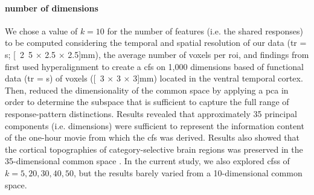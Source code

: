 

\paragraph{number of dimensions}


We chose a value of $k=10$ for the number of features (i.e. the shared
responses) to be computed considering the temporal and spatial resolution of our
data (\ac{tr} = \unit[2]{s}; \unit[2.5 $\times$ 2.5 $\times$ 2.5]{mm}), the
average number of voxels per \ac{roi}, and findings from \citet{haxby2011common}
%
\citet{haxby2011common} first used hyperalignment to create a \ac{cfs} on 1,000 dimensions based of functional data (\ac{tr} = \unit[3]{s}) of
voxels (\unit[3 $\times$ 3 $\times$ 3]{mm}) located in the ventral temporal
cortex.
%
Then, \citet{haxby2011common} reduced the dimensionality of the common space by
applying a \ac{pca} in order to determine the subspace that is sufficient to
capture the full range of response-pattern distinctions.
%
Results revealed that approximately 35 principal components (i.e. dimensions)
were sufficient to represent the information content of the one-hour movie from
which the \ac{cfs} was derived.
%
Results also showed that the cortical topographies of category-selective brain
regions was preserved in the 35-dimensional common space
\citep{haxby2011common}.
%
In the current study, we also explored \acp{cfs} of $k=5, 20, 30,
40, 50$, but the results barely varied from a 10-dimensional common space.

%
%


